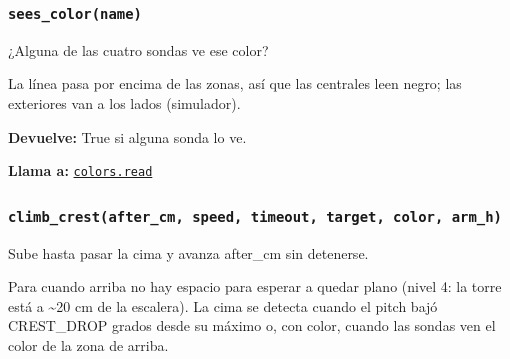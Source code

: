 \subsubsection{\texttt{sees\_\allowbreak{}color(name)}}\label{fn:motion:sees-color}
\noindent ¿Alguna de las cuatro sondas ve ese color?

La línea pasa por encima de las zonas, así que las centrales leen negro; las exteriores van a los lados (simulador).

\par{}\par\smallskip
\noindent\textbf{Devuelve:} True si alguna sonda lo ve.\par
\noindent\textbf{Llama a:} \hyperref[fn:colors:read]{\texttt{colors.read}}\par

\subsubsection{\texttt{climb\_\allowbreak{}crest(after\_\allowbreak{}cm, speed, timeout, target, color, arm\_\allowbreak{}h)}}\label{fn:motion:climb-crest}
\noindent Sube hasta pasar la cima y avanza after\_cm sin detenerse.

Para cuando arriba no hay espacio para esperar a quedar plano (nivel 4: la torre está a \textasciitilde{}20 cm de la escalera). La cima se detecta cuando el pitch bajó CREST\_DROP grados desde su máximo o, con color, cuando las sondas ven el color de la zona de arriba.

